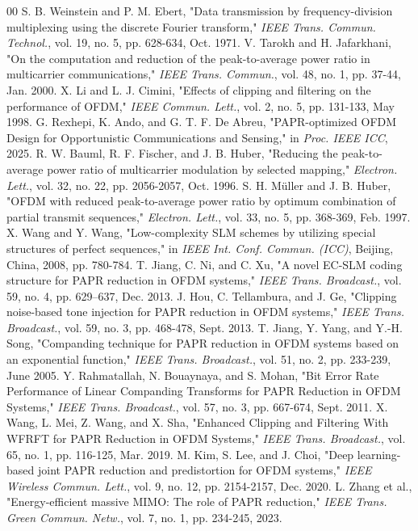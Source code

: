 \documentclass[12pt, a4paper, onecolumn]{article}
\begin{document}
\begin{thebibliography}{00}
     S. B. Weinstein and P. M. Ebert, "Data transmission by frequency-division multiplexing using the discrete Fourier transform," \textit{IEEE Trans. Commun. Technol.}, vol. 19, no. 5, pp. 628-634, Oct. 1971.
     V. Tarokh and H. Jafarkhani, "On the computation and reduction of the peak-to-average power ratio in multicarrier communications," \textit{IEEE Trans. Commun.}, vol. 48, no. 1, pp. 37-44, Jan. 2000.
     X. Li and L. J. Cimini, "Effects of clipping and filtering on the performance of OFDM," \textit{IEEE Commun. Lett.}, vol. 2, no. 5, pp. 131-133, May 1998.
     G. Rexhepi, K. Ando, and G. T. F. De Abreu, "PAPR-optimized OFDM Design for Opportunistic Communications and Sensing," in \textit{Proc. IEEE ICC}, 2025.
     R. W. Bauml, R. F. Fischer, and J. B. Huber, "Reducing the peak-to-average power ratio of multicarrier modulation by selected mapping," \textit{Electron. Lett.}, vol. 32, no. 22, pp. 2056-2057, Oct. 1996.
     S. H. Müller and J. B. Huber, "OFDM with reduced peak-to-average power ratio by optimum combination of partial transmit sequences," \textit{Electron. Lett.}, vol. 33, no. 5, pp. 368-369, Feb. 1997.
     X. Wang and Y. Wang, "Low-complexity SLM schemes by utilizing special structures of perfect sequences," in \textit{IEEE Int. Conf. Commun. (ICC)}, Beijing, China, 2008, pp. 780-784.
     T. Jiang, C. Ni, and C. Xu, "A novel EC-SLM coding structure for PAPR reduction in OFDM systems," \textit{IEEE Trans. Broadcast.}, vol. 59, no. 4, pp. 629–637, Dec. 2013.
     J. Hou, C. Tellambura, and J. Ge, "Clipping noise-based tone injection for PAPR reduction in OFDM systems," \textit{IEEE Trans. Broadcast.}, vol. 59, no. 3, pp. 468-478, Sept. 2013.
     T. Jiang, Y. Yang, and Y.-H. Song, "Companding technique for PAPR reduction in OFDM systems based on an exponential function," \textit{IEEE Trans. Broadcast.}, vol. 51, no. 2, pp. 233-239, June 2005.
     Y. Rahmatallah, N. Bouaynaya, and S. Mohan, "Bit Error Rate Performance of Linear Companding Transforms for PAPR Reduction in OFDM Systems," \textit{IEEE Trans. Broadcast.}, vol. 57, no. 3, pp. 667-674, Sept. 2011.
     X. Wang, L. Mei, Z. Wang, and X. Sha, "Enhanced Clipping and Filtering With WFRFT for PAPR Reduction in OFDM Systems," \textit{IEEE Trans. Broadcast.}, vol. 65, no. 1, pp. 116-125, Mar. 2019.
     M. Kim, S. Lee, and J. Choi, "Deep learning-based joint PAPR reduction and predistortion for OFDM systems," \textit{IEEE Wireless Commun. Lett.}, vol. 9, no. 12, pp. 2154-2157, Dec. 2020.
     L. Zhang et al., "Energy-efficient massive MIMO: The role of PAPR reduction," \textit{IEEE Trans. Green Commun. Netw.}, vol. 7, no. 1, pp. 234-245, 2023.
\end{thebibliography}
\end{document}
